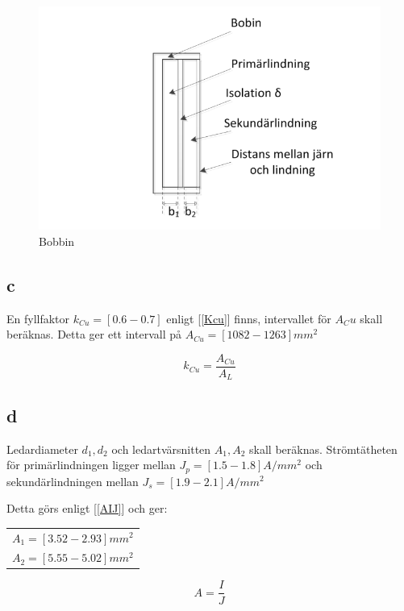 \documentclass{article}
\begin{document}
 \begin{figure}[H]
 \begin{center}
 \includegraphics[width=1\textwidth]{img/bobbin.png} %
 \caption{Bobbin}
 \label{fig:bobbin}
 \end{center}
 \end{figure}


\subsection{c}
En fyllfaktor $k_{Cu}=[0.6 - 0.7]$ enligt [\ref{Kcu}]  finns, intervallet för $A_Cu$ skall beräknas.
Detta ger ett intervall på $A_{Cu}=[1082 - 1263] mm^2$


\begin{equation}
  k_{Cu}=\frac{A_{Cu}}{A_L}
  \label{Kcu}
\end{equation}

\subsection{d}
Ledardiameter $d_1,d_2$ och ledartvärsnitten $A_1,A_2$ skall beräknas.
Strömtätheten för primärlindningen ligger mellan $J_p=[1.5 - 1.8] A/mm^2$ och sekundärlindningen mellan $J_s=[1.9 - 2.1] A/mm^2$

Detta görs enligt [\ref{AIJ}] och ger:
\begin{tabular}{|l}
  $A_1=[ 3.52 - 2.93] mm^2$\\
  $A_2=[ 5.55 - 5.02] mm^2$\\
\end{tabular}

\begin{equation}
  A=\frac{I}{J}
  \label{AIJ}
\end{equation}
\end{document}
